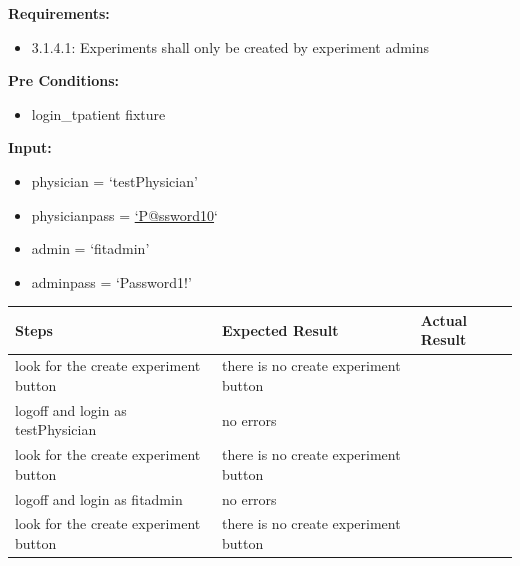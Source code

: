 \documentclass[letterpaper,10pt,english]{sphinxmanual}
\begin{document}
\begin{fulllineitems}
\label{STD/test_security:test_security.test_experiment_creation_security}
\textbf{Requirements:}
\begin{itemize}
\item {} 
3.1.4.1: Experiments shall only be created by experiment admins

\end{itemize}

\textbf{Pre Conditions:}
\begin{itemize}
\item {} 
login\_tpatient fixture

\end{itemize}

\textbf{Input:}
\begin{itemize}
\item {} 
physician = `testPhysician'

\item {} 
physicianpass = \href{mailto:'P@ssword10}{`P@ssword10}`

\item {} 
admin = `fitadmin'

\item {} 
adminpass = `Password1!'

\end{itemize}

\begin{tabulary}{\linewidth}{|L|L|L|}
\hline
\textsf{\relax 
Steps
} & \textsf{\relax 
Expected Result
} & \textsf{\relax 
Actual Result
}\\
\hline
look for the create experiment button
 & 
there is no create experiment button
 & \\
\hline
logoff and login as testPhysician
 & 
no errors
 & \\
\hline
look for the create experiment button
 & 
there is no create experiment button
 & \\
\hline
logoff and login as fitadmin
 & 
no errors
 & \\
\hline
look for the create experiment button
 & 
there is no create experiment button
 & \\
\hline\end{tabulary}


\end{fulllineitems}

\end{document}
